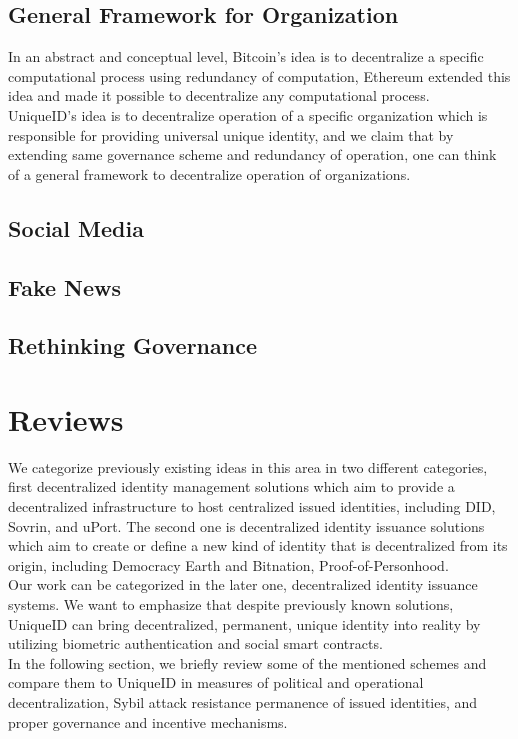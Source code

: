 \documentclass[conference]{IEEEtran}
\begin{document}
\subsection{General Framework for Organization}
In an abstract and conceptual level, Bitcoin's idea is to decentralize a specific computational process using redundancy of computation, Ethereum extended this idea and made it possible to decentralize any computational process.\\ UniqueID's idea is to decentralize operation of a specific organization which is responsible for providing universal unique identity, and we claim that by extending same governance scheme and redundancy of operation, one can think of a general framework to decentralize operation of organizations. 

\subsection{Social Media}
\subsection{Fake News}
\subsection{Rethinking Governance}

\section{Reviews}
We categorize previously existing ideas in this area in two different categories, first decentralized identity management solutions which aim to provide a decentralized infrastructure to host centralized issued identities, including DID, Sovrin, and uPort. The second one is decentralized identity issuance solutions which aim to create or define a new kind of identity that is decentralized from its origin, including Democracy Earth and Bitnation, Proof-of-Personhood.\\
Our work can be categorized in the later one, decentralized identity issuance systems. We want to emphasize that despite previously known solutions, UniqueID can bring decentralized, permanent, unique identity into reality by utilizing biometric authentication and social smart contracts. \\
In the following section, we briefly review some of the mentioned schemes and compare them to UniqueID in measures of political and operational decentralization, Sybil attack resistance  permanence of issued identities, and proper governance and incentive mechanisms. 
\end{document}
